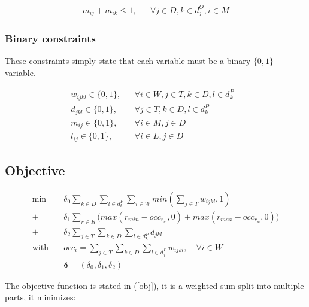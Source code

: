 \documentclass[../../thesis.tex]{subfiles}
\begin{document}
\begin{align}
  m_{ij} + m_{ik} \leq 1, && \forall j \in D, k \in d^O_j, i \in M  
\end{align}


\subsubsection{Binary constraints}

These constraints simply state that each variable must be a binary $\{ 0, 1 \}$ variable.

\begin{align}
  w_{ijkl} \in \{0, 1\}, && \forall i \in W, j \in T, k \in D, l \in d^P_k &\label{binary1} \\
  d_{jkl} \in \{0, 1\}, && \forall j \in T, k \in D, l \in d^P_k& \label{binary2} \\
  m_{ij} \in \{0, 1\}, && \forall i \in M, j \in D& \label{binary3} \\ 
  l_{ij} \in \{0, 1\}, && \forall i \in L, j \in D& \label{binary4} 
\end{align}




\subsection{Objective}


\begingroup
\allowdisplaybreaks
\begin{subequations}
  \label{obj}
  \begin{align}
    \textrm{min} \quad & \delta_0 \sum_{k \in D} \sum_{l \in d^P_k} \sum_{i \in W} min(\sum_{j \in T} w_{ijkl}, 1) \label{obj:1} \\ 
      + \ & \delta_1 \sum_{r \in R} \big( max(r_{min} - occ_{r_{w}}, 0) + max(r_{max} - occ_{r_{w}}, 0) \big)  \label{obj:3} \\ 
      + \ &\delta_2 \sum_{j \in T}\sum_{k\in D}\sum_{l \in d^P_k} d_{jkl} \label{obj:2} \\ 
     \textrm{with} \quad & occ_i = \sum_{j \in T} \sum_{k \in D} \sum_{l \in d^P_j} w_{ijkl}, \quad \forall i \in W  \nonumber \\ 
                         & \bm{\delta} = (\delta_0, \delta_1, \delta_2) \label{penalties:mip} \nonumber
  \end{align}
\end{subequations}
\endgroup


The objective function is stated in (\ref{obj}), it is a weighted sum split into multiple parts, it minimizes:
\end{document}
